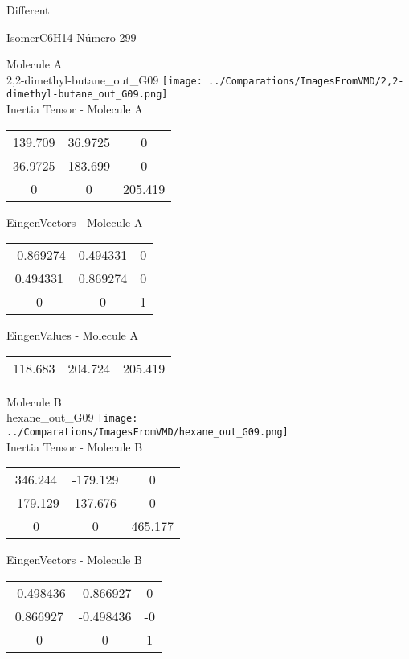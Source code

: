 \begin{center}
\vtab
\vtab
\textcolor{NavyBlue}{\Large Different}
\end{center}

 \newpage

\vtab[-2cm]
\begin{center}
{\large IsomerC6H14 \tab Número 299}
\end{center}
\begin{multicols}{2}
\begin{center}

Molecule A \\ 
2,2-dimethyl-butane\_out\_G09
\texttt{[image: ../Comparations/ImagesFromVMD/2,2-dimethyl-butane\_out\_G09.png]}
\\
Inertia Tensor - Molecule A \\
\vtab

\begin{tabular}{|c c c|}
139.709	 & 	36.9725	 & 	0	 \\
36.9725	 & 	183.699	 & 	0	 \\
0	 & 	0	 & 	205.419
\end{tabular}

\vtab
 EingenVectors - Molecule A     \\
\vtab
\begin{tabular}{|c c c|}
-0.869274	 & 	0.494331	 & 	0	 \\
0.494331	 & 	0.869274	 & 	0	 \\
0	 & 	0	 & 	1
\end{tabular}

\vtab
 EingenValues - Molecule A     \\
\vtab
\begin{tabular}{|c c c|}
118.683	 & 	204.724	 & 	205.419	 \\
\end{tabular}
\columnbreak

Molecule B \\ 
hexane\_out\_G09
\texttt{[image: ../Comparations/ImagesFromVMD/hexane\_out\_G09.png]}
\\
Inertia Tensor - Molecule B \\
\vtab

\begin{tabular}{|c c c|}
346.244	 & 	-179.129	 & 	0	 \\
-179.129	 & 	137.676	 & 	0	 \\
0	 & 	0	 & 	465.177
\end{tabular}

\vtab
 EingenVectors - Molecule B     \\
\vtab
\begin{tabular}{|c c c|}
-0.498436	 & 	-0.866927	 & 	0	 \\
0.866927	 & 	-0.498436	 & 	-0	 \\
0	 & 	0	 & 	1
\end{tabular}


\end{center}
\end{multicols}

